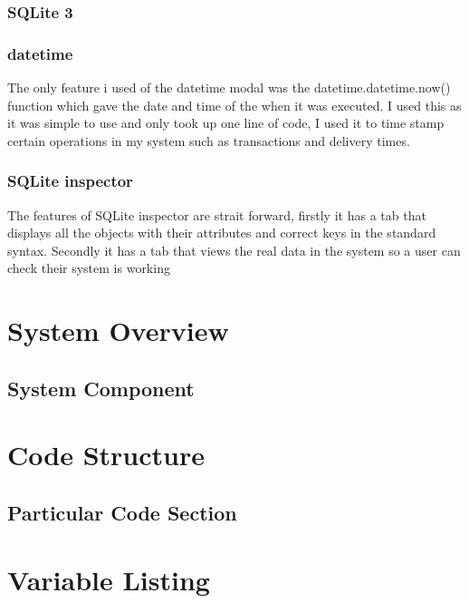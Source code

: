 \subsubsection{SQLite 3}


\subsubsection{datetime}
The only feature i used of the datetime modal was the datetime.datetime.now() function which gave the date and time of the when it was executed. I used this as it was simple to use and only took up one line of code, I used it to time stamp certain operations in my system such as transactions and delivery times.

\subsubsection{SQLite inspector}
The features of SQLite inspector are strait forward, firstly it has a tab that displays all the objects with their attributes and correct keys in the standard syntax. Secondly it has a tab that views the real data in the system so a user can check their system is working


\section{System Overview}

\subsection{System Component}

\section{Code Structure}

\subsection{Particular Code Section}

\section{Variable Listing}

